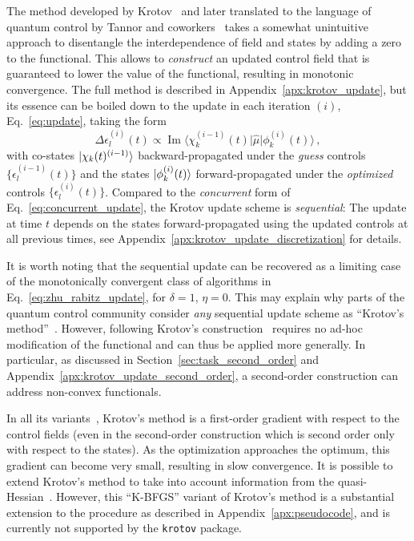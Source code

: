 \documentclass[submission, Phys]{SciPost}
\newcommand{\Op}[1]{\hat{#1}}
\renewcommand{\Im}[0]{\operatorname{Im}}
\begin{document}
The method developed by
Krotov~\cite{KrotovEC1983,KrotovCC1988,Krotov.book,KonnovARC99} and later
translated to the language of quantum control by Tannor and
coworkers~\cite{Tannor92,SomloiCP1993,BartanaJCP1997,SklarzPRA2002,ReichJCP12}
takes a somewhat unintuitive approach to disentangle the interdependence of
field and states by adding a zero to the functional.
This allows to \emph{construct} an updated control field that is guaranteed to
lower the value of the functional, resulting in monotonic convergence.
The full method is described in Appendix~\ref{apx:krotov_update}, but its
essence can be boiled down to the update in each iteration $(i)$,
Eq.~\eqref{eq:update}, taking the form
\begin{equation}
  \label{eq:sequential_update}
  \Delta \epsilon_l^{(i)}(t) \propto
    \Im \big\langle
    \chi_k^{(i-1)}(t)
    \big\vert
    \Op{\mu}
    \big\vert
    \phi_k^{(i)}(t)
    \big\rangle\,,
\end{equation}
with co-states $\ket{\chi_k(t)^{(i-1)}}$ backward-propagated under the
\emph{guess} controls $\{\epsilon_l^{(i-1)}(t)\}$ and the states
$\ket{\phi^{(i)}_k(t)}$ forward-propagated under the \emph{optimized} controls
$\{\epsilon_l^{(i)}(t)\}$.
Compared to the \emph{concurrent} form of Eq.~\eqref{eq:concurrent_update}, the
Krotov update scheme is \emph{sequential}: The update at time $t$ depends on the
states forward-propagated using the updated controls at all previous times, see
Appendix~\ref{apx:krotov_update_discretization} for details.

It is worth noting that the sequential update can be recovered as a limiting
case of the monotonically convergent class of algorithms in
Eq.~\eqref{eq:zhu_rabitz_update}, for $\delta = 1$, $\eta = 0$.
This may explain why parts of the quantum control community consider \emph{any}
sequential update scheme as ``Krotov's
method''~\cite{SchirmerNJP2011,MachnesPRA11}.
However, following Krotov's
construction~\cite{KrotovEC1983,KrotovCC1988,Krotov.book,KonnovARC99} requires
no ad-hoc modification of the functional and can thus be applied more generally.
In particular, as discussed in Section~\ref{sec:task_second_order} and
Appendix~\ref{apx:krotov_update_second_order}, a second-order construction can
address non-convex functionals.

In all its
variants~\cite{Tannor92,SomloiCP1993,BartanaJCP1997,SklarzPRA2002,ReichJCP12},
Krotov's method is a first-order gradient with respect to the control fields
(even in the second-order construction which is second order only with respect
to the states). As the optimization approaches the optimum, this gradient can
become very small, resulting in slow convergence.
It is possible to extend Krotov's method to take into account information from
the quasi-Hessian~\cite{EitanPRA11}.
However, this ``K-BFGS'' variant of Krotov's method is a substantial extension
to the procedure as described in Appendix~\ref{apx:pseudocode}, and is currently
not supported by the \texttt{krotov} package.
\end{document}
